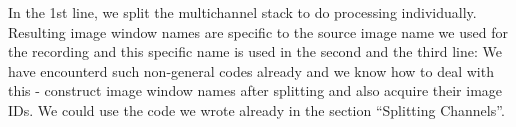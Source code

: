 In the 1st line, we split the multichannel stack to do processing individually. Resulting image window names are specific to the source image name we used for the recording and this specific name is used in the second and the third line:  We have encounterd such non-general codes already and we know how to deal with this - construct image window names after splitting and also acquire their image IDs. We could use the code we wrote already in the section ``Splitting Channels''.